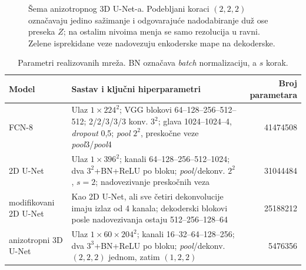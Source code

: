 \documentclass[11pt,a4paper]{article}
\begin{document}
\begin{figure}[H]
{}
	\caption{Šema anizotropnog 3D U-Net-a. Podebljani koraci $(2,2,2)$ označavaju jedino sažimanje i odgovarajuće nadodabiranje duž ose preseka $Z$; na ostalim nivoima menja se samo rezolucija u ravni. Zelene isprekidane veze nadovezuju enkoderske mape na dekoderske.}
	\label{fig:unet3d-architecture}
\end{figure}

\begin{table}[H]
	\centering
	\caption{Parametri realizovanih mreža. BN označava \textit{batch} normalizaciju, a $s$ korak.}
	\label{tab:architectures}
	\small
	\begin{tabularx}{\textwidth}{l X r}
		\toprule
		Model                 & Sastav i ključni hiperparametri                                                                                                                          & Broj parametara \\
		\midrule
		FCN-8                 & Ulaz $1\times224^2$; VGG blokovi 64--128--256--512--512; 2/2/3/3/3 konv. $3^2$; glava 1024--1024--4, \textit{dropout} 0,5; \textit{pool} $2^2$, preskočne veze \textit{pool}3/\textit{pool}4 & \num{41474508}  \\
		2D U-Net              & Ulaz $1\times396^2$; kanali 64--128--256--512--1024; dva $3^2$+BN+ReLU po bloku; \textit{pool}/dekonv. $2^2$, $s=2$; nadovezivanje preskočnih veza                & \num{31044484}  \\
		modifikovani 2D U-Net & Kao 2D U-Net, ali sve četiri dekonvolucije imaju izlaz od 4 kanala; dekoderski blokovi posle nadovezivanja ostaju 512--256--128--64                      & \num{25188212}  \\
		anizotropni 3D U-Net  & Ulaz $1\times60\times204^2$; kanali 16--32--64--128--256; dva $3^3$+BN+ReLU po bloku; \textit{pool}/dekonv. $(2,2,2)$ jednom, zatim $(1,2,2)$                     & \num{5476356}   \\
		\bottomrule
	\end{tabularx}
\end{table}
\end{document}
